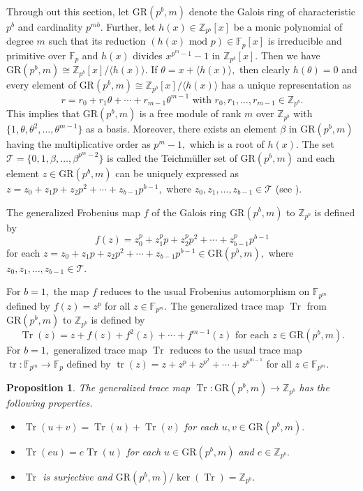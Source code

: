 \documentclass{article}
\DeclareMathOperator{\tr}{tr}
\DeclareMathOperator{\Tr}{Tr}
\newtheorem{prop}{Proposition}[section]
\theoremstyle{remark}
\theoremstyle{definition}
\numberwithin{equation}{section}
\begin{document}
Through out this section, let $\text{GR}(p^b,m)$ denote the Galois ring of characteristic $p^b$ and cardinality $p^{mb}.$  Further, let $h(x)\in \mathbb{Z}_{p^b}[x]$ be a monic polynomial of degree $m$ such that its reduction $(h(x) \text{ mod } p) \in \mathbb{F}_{p}[x]$ is irreducible and primitive over $\mathbb{F}_{p}$ and $h(x)$ divides $x^{p^m-1}-1$ in $\mathbb{Z}_{p^b}[x].$  Then we have  $\text{GR}(p^b,m) \cong \mathbb{Z}_{p^b}[x]/ \langle h(x) \rangle.$ If $\theta=x+\langle h(x) \rangle,$ then clearly $h(\theta)=0$ and every element of $\text{GR}(p^b,m) \cong \mathbb{Z}_{p^b}[x]/ \langle h(x) \rangle$ has a unique representation as $$r=r_0+r_1\theta+\cdots+r_{m-1}\theta^{m-1} \text{~with~} r_0,r_1,\ldots,r_{m-1} \in \mathbb{Z}_{p^b}.$$
This implies that $\text{GR}(p^b,m)$ is a free module of rank $m$ over  $\mathbb{Z}_{p^b}$ with $\{1,\theta,\theta^2,\ldots,\theta^{m-1}\}$ as a basis.
 Moreover,   there exists an element $\beta$  in $\text{GR}(p^b,m)$ having the multiplicative order as  $p^{m}-1,$ which is a root of $h(x).$ The set $\mathcal{T}= \{ 0,1, \beta,\ldots,\beta^{p^{m}-2} \}$ is called the Teichm\"{u}ller set of $\text{GR}(p^b,m)$ and each element $z \in \text{GR}(p^b,m)$ can be uniquely expressed as $z=z_0+ z_1 p+ z_2 p^2+\cdots + z_{b-1} p^{b-1},$ where $z_0,z_1,\ldots,z_{b-1} \in \mathcal{T}$ (see \cite[Chp. 14]{wan}). 

 
The generalized Frobenius map $f$ of the Galois ring $\text{GR}(p^b,m)$ to $\mathbb{Z}_{p^b}$ is defined by $$f(z)=z^p_0+ z^p_1 p+ z^p_2 p^2+\cdots + z^p_{b-1} p^{b-1}$$ for each $z=z_0+ z_1 p+ z_2 p^2+\cdots + z_{b-1} p^{b-1} \in \text{GR}(p^b,m),$ where $z_0,z_1,\ldots,z_{b-1} \in \mathcal{T}.$  

For $b = 1,$ the map $f$ reduces to the usual Frobenius automorphism on $\mathbb{F}_{p^m}$ defined by $f(z)=z^p$ for all $z \in \mathbb{F}_{p^m}.$ 
The generalized trace map ${\Tr}$ from $\text{GR}(p^b,m)$ to $\mathbb{Z}_{p^b}$ is defined by 
$${\Tr}(z)=z+f(z)+f^2(z)+\cdots+f^{m-1}(z) \text{ for each } z \in \text{GR}(p^b,m).$$
For $b=1,$ generalized trace map ${\Tr}$  reduces to the usual trace map  ${\tr}: \mathbb{F}_{p^m}  \to \mathbb{F}_{p}$  defined by ${\tr}(z) =z+z^p+z^{p^2}+\cdots+z^{p^{m-1}}$ for all $z \in \mathbb{F}_{p^m}.$ 
\begin{prop}\cite{sison}  The generalized trace map ${\Tr}:\text{GR}(p^b,m) \to  \mathbb{Z}_{p^b}$ has the following properties.
\begin{itemize}
\item ${\Tr}(u+v)={\Tr}(u)+{\Tr}(v)$ for each $u,v \in \text{GR}(p^b,m).$
\item  ${\Tr}(e u)=e{\Tr}(u)$ for each $u \in \text{GR}(p^b,m)$ and $e \in \mathbb{Z}_{p^b}.$
\item  ${\Tr}$ is surjective and $\text{GR}(p^b,m)/ \ker( {\Tr} )=\mathbb{Z}_{p^b}.$
\end{itemize}
\end{prop}
\end{document}
